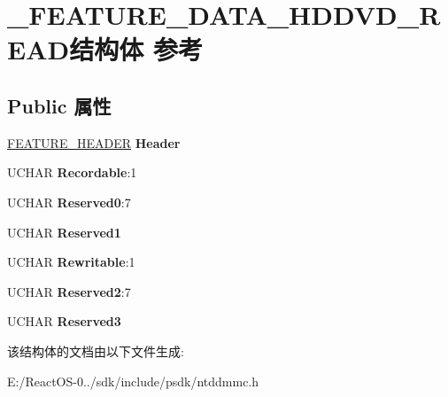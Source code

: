 \hypertarget{struct___f_e_a_t_u_r_e___d_a_t_a___h_d_d_v_d___r_e_a_d}{}\section{\+\_\+\+F\+E\+A\+T\+U\+R\+E\+\_\+\+D\+A\+T\+A\+\_\+\+H\+D\+D\+V\+D\+\_\+\+R\+E\+A\+D结构体 参考}
\label{struct___f_e_a_t_u_r_e___d_a_t_a___h_d_d_v_d___r_e_a_d}
\subsection*{Public 属性}
\begin{DoxyCompactItemize}
\item 
\mbox{\label{struct___f_e_a_t_u_r_e___d_a_t_a___h_d_d_v_d___r_e_a_d_adffc3f5b9ed7010ee50264c09d81a6a1}} 
\hyperlink{struct___f_e_a_t_u_r_e___h_e_a_d_e_r}{F\+E\+A\+T\+U\+R\+E\+\_\+\+H\+E\+A\+D\+ER} {\bfseries Header}
\item 
\mbox{\label{struct___f_e_a_t_u_r_e___d_a_t_a___h_d_d_v_d___r_e_a_d_a69772a78c83e15ac4fc972c467afa280}} 
U\+C\+H\+AR {\bfseries Recordable}\+:1
\item 
\mbox{\label{struct___f_e_a_t_u_r_e___d_a_t_a___h_d_d_v_d___r_e_a_d_a81f3e988605f1e78e31ac8ed42543969}} 
U\+C\+H\+AR {\bfseries Reserved0}\+:7
\item 
\mbox{\label{struct___f_e_a_t_u_r_e___d_a_t_a___h_d_d_v_d___r_e_a_d_a48944720253dae32c47d20d6c73c2b6d}} 
U\+C\+H\+AR {\bfseries Reserved1}
\item 
\mbox{\label{struct___f_e_a_t_u_r_e___d_a_t_a___h_d_d_v_d___r_e_a_d_a78d42d073d55b739a636d9d1faafd1a1}} 
U\+C\+H\+AR {\bfseries Rewritable}\+:1
\item 
\mbox{\label{struct___f_e_a_t_u_r_e___d_a_t_a___h_d_d_v_d___r_e_a_d_adbd6f602e57bd28c5fbb587867611b55}} 
U\+C\+H\+AR {\bfseries Reserved2}\+:7
\item 
\mbox{\label{struct___f_e_a_t_u_r_e___d_a_t_a___h_d_d_v_d___r_e_a_d_ab00814841d1d63433d07beb4d5065859}} 
U\+C\+H\+AR {\bfseries Reserved3}
\end{DoxyCompactItemize}


该结构体的文档由以下文件生成\+:\begin{DoxyCompactItemize}
\item 
E\+:/\+React\+O\+S-\/0../sdk/include/psdk/ntddmmc.\+h\end{DoxyCompactItemize}
